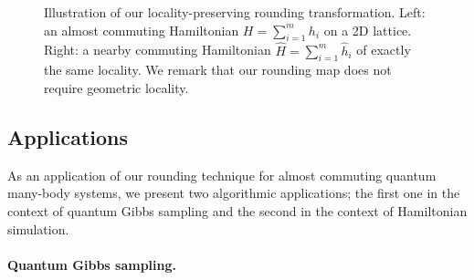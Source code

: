\documentclass[a4paper,onecolumn,11pt]{quantumarticle}
\theoremstyle{plain}
\begin{document}
\begin{figure}[t]
\caption{Illustration of our locality-preserving rounding transformation. 
Left: an almost commuting Hamiltonian $H=\sum_{i=1}^m h_i$ on a 2D lattice. 
Right: a nearby commuting Hamiltonian $\hat{H}=\sum_{i=1}^m \hat{h}_i$ of exactly the same locality. We remark that our rounding map does not require geometric locality.}
\end{figure}




\subsection{Applications}

As an application of our rounding technique for almost commuting quantum many-body systems, we present two algorithmic applications; the first one in the context of quantum Gibbs sampling and the second in the context of Hamiltonian simulation.

\paragraph{Quantum Gibbs sampling.}
\end{document}
